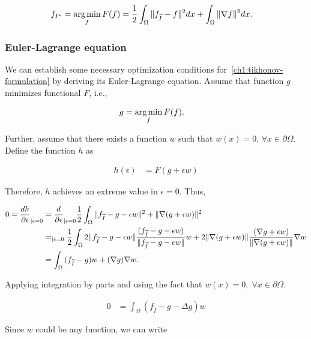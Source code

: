 \begin{align}
	f_{I^{\star}} &= \operatorname*{arg\,min}_{f} F(f) = \frac{1}{2} \int_{\Omega}{ \lVert f_{\widetilde{I}} - f\rVert^2dx} + \int_{\Omega}{ \lVert \nabla f \rVert^2 dx }.
	\label{ch1:tikhonov-formulation}
\end{align}

\subsubsection{Euler-Lagrange equation}

We can establish some necessary optimization conditions for~\cref{ch1:tikhonov-formulation} by deriving its Euler-Lagrange equation. Assume that function $g$ minimizes functional $F$, i.e.,

\begin{align*}
	g &= \operatorname*{arg\,min}_{f}{F(f)}.
\end{align*}

Further, assume that there exists a function $w$ such that $w(x)=0,\, \forall x \in \partial \Omega$. Define the function $h$ as

\begin{align*}
	h(\epsilon) &= F(g+\epsilon w)
\end{align*}

Therefore, $h$ achieves an extreme value in $\epsilon=0$. Thus,

\begin{align*}
	0 = \frac{dh}{\partial \epsilon}_{| \epsilon=0} &= \frac{d}{\partial \epsilon}_{| \epsilon=0} \frac{1}{2} \int_{\Omega}{ \lVert f_{\widetilde{I}} - g - \epsilon w\rVert^2 + \lVert \nabla (g + \epsilon w) \rVert^2} \\
	&= _{| \epsilon = 0} \frac{1}{2} \int_{\Omega}{ 2\lVert f_{\widetilde{I}} - g - \epsilon w\rVert\frac{(f_{\widetilde{I}} - g - \epsilon w) }{\lVert f_{\widetilde{I}} - g - \epsilon w\rVert}w + 2\lVert \nabla (g + \epsilon w) \rVert\frac{(\nabla g + \epsilon w)}{\lVert \nabla (g + \epsilon w) \rVert}\nabla w} \\
	&= \int_{\Omega}{ (f_{\widetilde{I}} - g)w + (\nabla g)\nabla w}. 	
\end{align*}

Applying integration by parts and using the fact that $w(x)=0,\; \forall x \in \partial \Omega$.

\begin{align*}
		0 &= \int_{\Omega} ( f_{\widetilde{I}} - g - \Delta g )w
\end{align*}

Since $w$ could be any function, we can write

